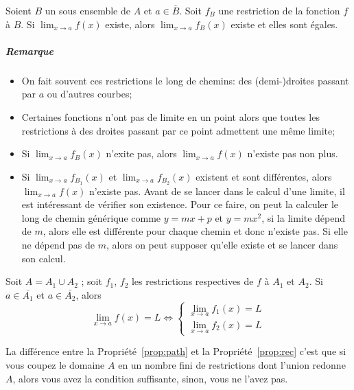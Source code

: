 \begin{myprop}
	\label{prop:path}
	Soient $B$ un sous ensemble de $A$ et $a \in \bar{B}$.
	Soit $f_B$ une restriction de la fonction $f$ à $B$.
	Si
	\( \lim_{x \to a}f(x) \)
	existe, alors
	\( \lim_{x \to a}f_B(x) \)
	existe et elles sont égales.
	\subparagraph{Remarque}
	\begin{itemize}
		\item On fait souvent ces restrictions le long de chemins: des (demi-)droites passant par $a$ ou d'autres courbes;
		\item Certaines fonctions n'ont pas de limite en un point alors que toutes les restrictions à des droites passant par
			ce point admettent une même limite;
		\item Si $\lim_{x \to a}f_B(x)$ n'exite pas, alors $\lim_{x \to a} f(x)$ n'existe pas non plus.
		\item Si $\lim_{x \to a}f_{B_1}(x)$ et $\lim_{x \to a}f_{B_2}(x)$ existent et sont différentes, alors
			$\lim_{x \to a} f(x)$ n'existe pas.
			Avant de se lancer dans le calcul d'une limite, il est intéressant de vérifier son existence. Pour ce
			faire, on peut la calculer le long de chemin générique comme $y = mx + p$ et $y = mx^2$, si la
			limite dépend de $m$, alors elle est différente pour chaque chemin et donc n'existe pas. Si elle ne dépend
			pas de $m$, alors on peut supposer qu'elle existe et se lancer dans son calcul.

	\end{itemize}
\end{myprop}

\begin{myprop}
	\label{prop:rec}
	Soit $A = A_1 \cup A_2$ ; soit $f_1$, $f_2$ les restrictions respectives de $f$ à $A_1$ et $A_2$. Si $a \in \bar{A_1}$ et $a \in \bar{A_2}$, alors
	\[ \lim_{x \to a}f(x) = L \Leftrightarrow \left\{
	\begin{array}{l}
		\lim_{x \to a} f_1(x) = L \\
		\lim_{x \to a}f_2(x) = L
	\end{array} \right. \]
\end{myprop}

\begin{myrem}
	La différence entre la Propriété~\ref{prop:path} et la Propriété~\ref{prop:rec} c'est que
	si vous coupez le domaine $A$ en un nombre fini de restrictions dont l'union redonne $A$,
	alors vous avez la condition suffisante, sinon, vous ne l'avez pas.
\end{myrem}

